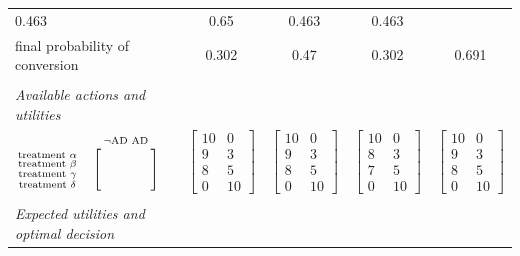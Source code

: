 \documentclass[utf8]{FrontiersinHarvard} %
\renewcommand*{\|}[1][]{\nonscript\:#1\vert\nonscript\:\mathopen{}}
\newcommand*{\AD}{\mathrm{AD}}
\newcommand*{\nAD}{\lnot\mathrm{AD}}
\begin{document}
\begin{table}[!t]
\begin{tabular}{lcccc}
    0.463&0.65&0.463&0.463
    \\[\jot]
    {\small final probability of conversion}&
    0.302&0.47&0.302&0.691
    \\[2\jot] \hline\\
    \emph{\small Available actions and utilities}&&&& \\[\jot]
    $
    \begin{matrix}
      &\begin{smallmatrix}\nAD&\AD\end{smallmatrix}\\
      \begin{smallmatrix}
      \text{treatment $\alpha$}\\
      \text{treatment $\beta$}\\
      \text{treatment $\gamma$}\\
      \text{treatment $\delta$}
    \end{smallmatrix}&
    \Biggl[\begin{smallmatrix}
      \hphantom{\nAD}&\hphantom{\AD}\\&\\&\\&
    \end{smallmatrix}\Biggr]
    \end{matrix}$
    &
    $\begin{bmatrix}10&0\\9&3\\8&5\\0&10\end{bmatrix}$
    &
    $\begin{bmatrix}10&0\\9&3\\8&5\\0&10\end{bmatrix}$
    &
    $\begin{bmatrix}10&0\\8&3\\7&5\\0&10\end{bmatrix}$
    &
    $\begin{bmatrix}10&0\\9&3\\8&5\\0&10\end{bmatrix}$
    \\[7\jot] \hline\\
    \emph{\small Expected utilities and optimal decision}&&&& \\[\jot]

\end{tabular}
\end{table}
\end{document}
